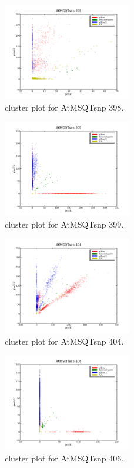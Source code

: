 \begin{figure}[H]
\includegraphics[width=0.5\textwidth]{figures/cluster_plot_AtMSQTsnp_398.png}
\caption{cluster plot for AtMSQTsnp 398.} \label{flAtMSQTsnp398}
\end{figure}

\begin{figure}[H]
\includegraphics[width=0.5\textwidth]{figures/cluster_plot_AtMSQTsnp_399.png}
\caption{cluster plot for AtMSQTsnp 399.} \label{flAtMSQTsnp399}
\end{figure}

\begin{figure}[H]
\includegraphics[width=0.5\textwidth]{figures/cluster_plot_AtMSQTsnp_404.png}
\caption{cluster plot for AtMSQTsnp 404.} \label{flAtMSQTsnp404}
\end{figure}

\begin{figure}[H]
\includegraphics[width=0.5\textwidth]{figures/cluster_plot_AtMSQTsnp_406.png}
\caption{cluster plot for AtMSQTsnp 406.} \label{flAtMSQTsnp406}
\end{figure}

